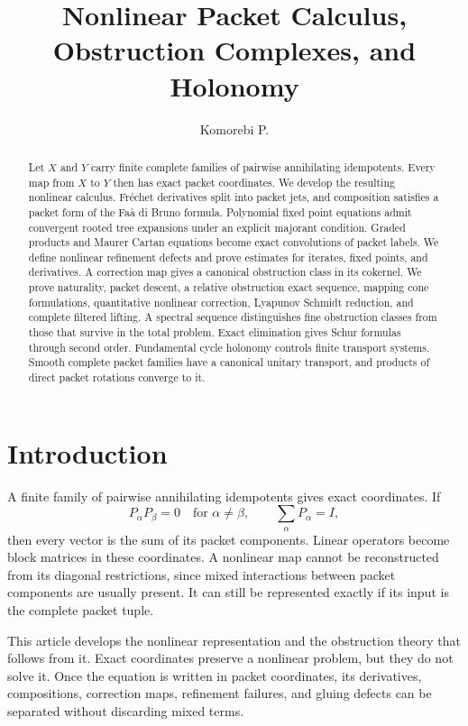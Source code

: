 \documentclass{aomart}
\title[Nonlinear packet calculus]{Nonlinear Packet Calculus, Obstruction Complexes, and Holonomy}
\author[Komorebi P.]{Komorebi P.}
\theoremstyle{definition}
\theoremstyle{remark}
\begin{document}
\begin{abstract}
Let $X$ and $Y$ carry finite complete families of pairwise annihilating idempotents.  Every map from $X$ to $Y$ then has exact packet coordinates.  We develop the resulting nonlinear calculus.  Fr\'echet derivatives split into packet jets, and composition satisfies a packet form of the Fa\`a di Bruno formula.  Polynomial fixed point equations admit convergent rooted tree expansions under an explicit majorant condition.  Graded products and Maurer Cartan equations become exact convolutions of packet labels.  We define nonlinear refinement defects and prove estimates for iterates, fixed points, and derivatives.  A correction map gives a canonical obstruction class in its cokernel.  We prove naturality, packet descent, a relative obstruction exact sequence, mapping cone formulations, quantitative nonlinear correction, Lyapunov Schmidt reduction, and complete filtered lifting.  A spectral sequence distinguishes fine obstruction classes from those that survive in the total problem.  Exact elimination gives Schur formulas through second order.  Fundamental cycle holonomy controls finite transport systems.  Smooth complete packet families have a canonical unitary transport, and products of direct packet rotations converge to it.
\end{abstract}
\maketitle
\thispagestyle{plain}

\section{Introduction}\label{sec:introduction}

A finite family of pairwise annihilating idempotents gives exact coordinates.  If
\[
P_\alpha P_\beta=0
\quad\text{for }\alpha\ne\beta,
\qquad
\sum_\alpha P_\alpha=I,
\]
then every vector is the sum of its packet components.  Linear operators become block matrices in these coordinates.  A nonlinear map cannot be reconstructed from its diagonal restrictions, since mixed interactions between packet components are usually present.  It can still be represented exactly if its input is the complete packet tuple.

This article develops the nonlinear representation and the obstruction theory that follows from it.  Exact coordinates preserve a nonlinear problem, but they do not solve it.  Once the equation is written in packet coordinates, its derivatives, compositions, correction maps, refinement failures, and gluing defects can be separated without discarding mixed terms.
\end{document}
